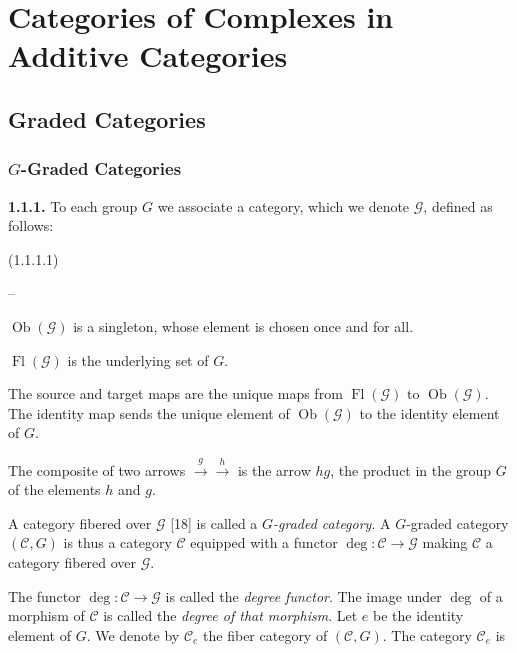 \chapter{Categories of Complexes in Additive Categories}

\section{Graded Categories}

\subsection{\texorpdfstring{$G$}{G}-Graded Categories}

\noindent\textbf{1.1.1.}\quad
To each group $G$ we associate a category, which we denote $\mathcal G$,
defined as follows:

\noindent\textnormal{(1.1.1.1)}
\begin{list}{--}{%
  \setlength{\leftmargin}{2em}%
  \setlength{\itemsep}{0.25em}%
  \setlength{\topsep}{0.25em}%
}
  \item {}%
    $\operatorname{Ob}(\mathcal G)$ is a singleton, whose element is
    chosen once and for all.
  \item {}%
    $\operatorname{Fl}(\mathcal G)$ is the underlying set of $G$.
  \item {}%
    The source and target maps are the unique maps from
    $\operatorname{Fl}(\mathcal G)$ to $\operatorname{Ob}(\mathcal G)$.
    The identity map sends the unique element of
    $\operatorname{Ob}(\mathcal G)$ to the identity element of $G$.
  \item {}%
    The composite of two arrows
    ${}\xrightarrow{g}{}\xrightarrow{h}{}$ is the arrow $hg$, the product in
    the group $G$ of the elements $h$ and $g$.
\end{list}

A category fibered over $\mathcal G$ [18] is called a
\emph{$G$-graded category}. A $G$-graded category $(\mathcal C,G)$ is thus a
category $\mathcal C$ equipped with a functor
$\deg\colon\mathcal C\to\mathcal G$ making $\mathcal C$ a category fibered
over $\mathcal G$.

The functor $\deg\colon\mathcal C\to\mathcal G$ is called the
\emph{degree functor}. The image under $\deg$ of a morphism of $\mathcal C$
is called the \emph{degree of that morphism}.
Let $e$ be the identity element
of $G$. We denote by $\mathcal C_e$ the fiber category of $(\mathcal C,G)$.
The category $\mathcal C_e$ is
